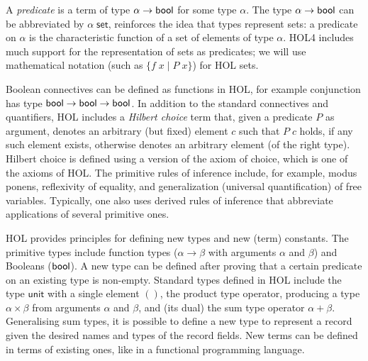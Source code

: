 \documentclass[twoside,titlepage,11pt]{article}
\begin{document}
A \emph{predicate} is a term of type $\alpha\to\mathsf{bool}$ for some type $\alpha$.
The type $\alpha\to\mathsf{bool}$ can be abbreviated by $\alpha\;\mathsf{set}$, reinforces the idea that types represent sets: a predicate on $\alpha$ is the characteristic function of a set of elements of type $\alpha$.
HOL4 includes much support for the representation of sets as predicates; we will use mathematical notation (such as $\{f\;x\mid P\;x\}$) for HOL sets.

Boolean connectives can be defined as functions in HOL, for example conjunction has type $\mathsf{bool}\to\mathsf{bool}\to\mathsf{bool}$.
In addition to the standard connectives and quantifiers, HOL includes a \emph{Hilbert choice} term that, given a predicate $P$ as argument, denotes an arbitrary (but fixed) element $c$ such that $P\; c$ holds, if any such element exists, otherwise denotes an arbitrary element (of the right type).
Hilbert choice is defined using a version of the axiom of choice, which is one of the axioms of HOL.
The primitive rules of inference include, for example, modus ponens, reflexivity of equality, and generalization (universal quantification) of free variables.
Typically, one also uses derived rules of inference that abbreviate applications of several primitive ones.

HOL provides principles for defining new types and new (term) constants.
The primitive types include function types ($\alpha\to\beta$ with arguments $\alpha$ and $\beta$) and Booleans ($\mathsf{bool}$).
A new type can be defined after proving that a certain predicate on an existing type is non-empty.
Standard types defined in HOL include the type $\mathsf{unit}$ with a single element $()$, the product type operator, producing a type $\alpha\times\beta$ from arguments $\alpha$ and $\beta$, and (its dual) the sum type operator $\alpha+\beta$.
Generalising sum types, it is possible to define a new type to represent a record given the desired names and types of the record fields.
New terms can be defined in terms of existing ones, like in a functional programming language.
\end{document}
